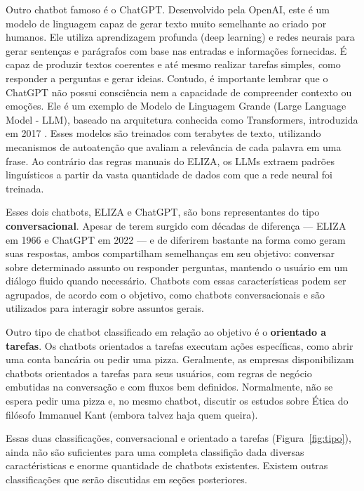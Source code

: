 \documentclass[14pt,a4paper,oneside]{book}
\begin{document}
Outro chatbot famoso é o ChatGPT. Desenvolvido pela OpenAI, este é um modelo de linguagem capaz de gerar texto muito semelhante ao criado por humanos. Ele utiliza aprendizagem profunda (deep learning) e redes neurais para gerar sentenças e parágrafos com base nas entradas e informações fornecidas. É capaz de produzir textos coerentes e até mesmo realizar tarefas simples, como responder a perguntas e gerar ideias. Contudo, é importante lembrar que o ChatGPT não possui consciência nem a capacidade de compreender contexto ou emoções. Ele é um exemplo de Modelo de Linguagem Grande (Large Language Model - LLM), baseado na arquitetura conhecida como Transformers, introduzida em 2017 \cite{Vaswani2017}. Esses modelos são treinados com terabytes de texto, utilizando mecanismos de autoatenção que avaliam a relevância de cada palavra em uma frase. Ao contrário das regras manuais do ELIZA, os LLMs extraem padrões linguísticos a partir da vasta quantidade de dados com que a rede neural foi treinada.

Esses dois chatbots, ELIZA e ChatGPT, são bons representantes do tipo \textbf{conversacional}. 
Apesar de terem surgido com décadas de diferença — ELIZA em 1966 e ChatGPT em 2022 — e de diferirem bastante na forma como geram suas respostas, ambos compartilham semelhanças em seu objetivo: conversar sobre determinado assunto ou responder perguntas, mantendo o usuário em um diálogo fluido quando necessário. Chatbots com essas características podem ser agrupados, de acordo com o objetivo, como chatbots conversacionais e são utilizados para interagir sobre assuntos gerais.

Outro tipo de chatbot classificado em relação ao objetivo é o \textbf{orientado a tarefas}. Os chatbots orientados a tarefas executam ações específicas, como abrir uma conta bancária ou pedir uma pizza. Geralmente, as empresas disponibilizam chatbots orientados a tarefas para seus usuários, com regras de negócio embutidas na conversação e com fluxos bem definidos. Normalmente, não se espera pedir uma pizza e, no mesmo chatbot, discutir os estudos sobre Ética do filósofo Immanuel Kant (embora talvez haja quem queira). 

Essas duas classificações, conversacional e orientado a tarefas  (Figura~\ref{fig:tipo}), ainda não são suficientes para uma completa classifição dada diversas caractéristicas e enorme quantidade de chatbots existentes. 
Existem outras classificações que serão discutidas em seções posteriores.
\end{document}
